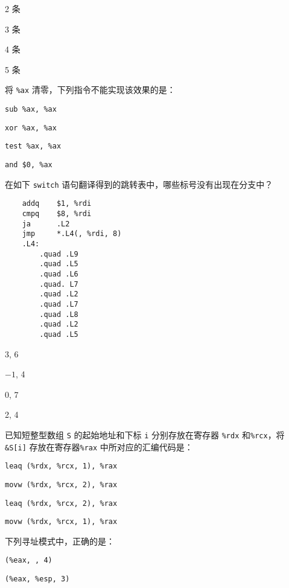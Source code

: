 \begin{problems}
\begin{choices}
            \item 2 条
            \item 3 条
            \item 4 条
            \item 5 条
        \end{choices}
         将 \verb|%ax| 清零，下列指令不能实现该效果的是：
        \begin{choices}
            \item \verb|sub %ax, %ax|
            \item \verb|xor %ax, %ax|
            \item \verb|test %ax, %ax|
            \item \verb|and $0, %ax|
        \end{choices}
         在如下 \verb|switch| 语句翻译得到的跳转表中，哪些标号没有出现在分支中？
        \begin{verbatim}
    addq    $1, %rdi
    cmpq    $8, %rdi
    ja      .L2
    jmp     *.L4(, %rdi, 8)
    .L4:
        .quad .L9
        .quad .L5
        .quad .L6
        .quad. L7
        .quad .L2
        .quad .L7
        .quad .L8
        .quad .L2
        .quad .L5
        \end{verbatim}
        \begin{choices}
            \item 3, 6
            \item $-1$, 4
            \item 0, 7
            \item 2, 4
        \end{choices}
         已知短整型数组 \verb|S| 的起始地址和下标 \verb|i| 分别存放在寄存器 \verb|%rdx| 和\verb|%rcx|，将 \verb|&S[i]| 存放在寄存器\verb|%rax| 中所对应的汇编代码是：
        \begin{choices}
            \item \verb|leaq (%rdx, %rcx, 1), %rax|
            \item \verb|movw (%rdx, %rcx, 2), %rax|
            \item \verb|leaq (%rdx, %rcx, 2), %rax|
            \item \verb|movw (%rdx, %rcx, 1), %rax|
        \end{choices}
         下列寻址模式中，正确的是：
        \begin{choices}
            \item \verb|(%eax, , 4)|
            \item \verb|(%eax, %esp, 3)|

\end{choices}
\end{problems}

